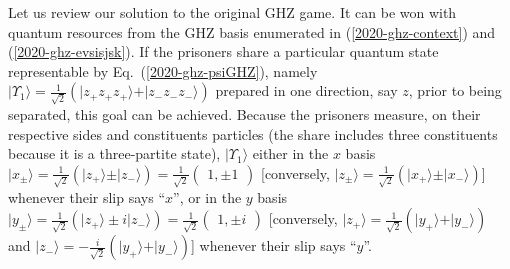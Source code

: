 \documentclass[sn-mathphys]{sn-jnl}%
\theoremstyle{thmstyleone}%
\theoremstyle{thmstyletwo}%
\theoremstyle{thmstylethree}%
\begin{document}
Let us review our solution to the original GHZ game.
It can be won with
quantum resources from the GHZ basis
enumerated in (\ref{2020-ghz-context}) and (\ref{2020-ghz-evsisjsk}).
If the prisoners share a particular quantum state representable by Eq.~(\ref{2020-ghz-psiGHZ}), namely
$\vert \Upsilon_1 \rangle = \frac{1}{\sqrt{2}}
\left(
\vert {z_+}{z_+}{z_+} \rangle +
\vert {z_-}{z_-}{z_-} \rangle
\right)$
prepared in one direction, say $z$,
prior to being separated, this goal can be achieved.
Because the prisoners measure, on their respective sides and constituents particles
(the share includes three constituents because it is a three-partite state),
 $\vert \Upsilon_1 \rangle$ either in the $x$ basis
$\vert x_\pm \rangle  = \frac{1}{\sqrt{2}}
\left(
\vert {z_+} \rangle \pm
\vert {z_-} \rangle
\right)  = \frac{1}{\sqrt{2}}
\begin{pmatrix}
1,\pm 1
\end{pmatrix}
$
[conversely,
$\vert {z_\pm} \rangle  = \frac{1}{\sqrt{2}}
\left(
\vert x_+ \rangle \pm
\vert x_- \rangle
\right)
${\large]}
whenever their slip says ``$x$'',
or   in the $y$ basis
$\vert y_\pm \rangle  = \frac{1}{\sqrt{2}}
\left(
\vert {z_+} \rangle \pm
i
\vert {z_-} \rangle
\right) = \frac{1}{\sqrt{2}}
\begin{pmatrix}
1,\pm i
\end{pmatrix}
$
[conversely,
$\vert {z_+} \rangle  = \frac{1}{\sqrt{2}}
\left(
\vert y_+ \rangle +
\vert y_- \rangle
\right)$
and $\vert {z_-} \rangle  = -\frac{i}{\sqrt{2}}
\left(
\vert y_+ \rangle +
\vert y_- \rangle
\right)
${\large]}
whenever their slip says ``$y$''.
\end{document}
